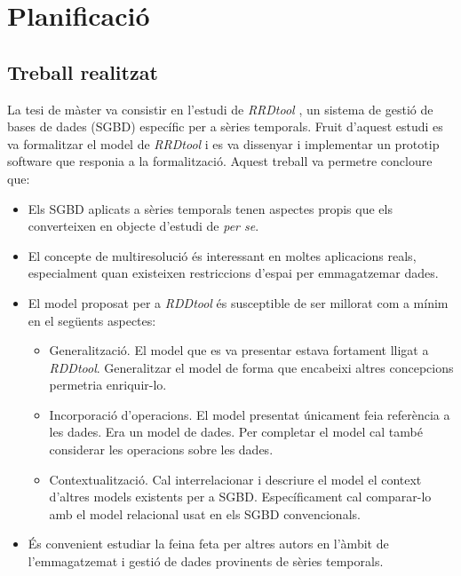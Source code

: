 \chapter{Planificació}

\section{Treball realitzat}


La tesi de màster \parencite{llusa11:tfm} va consistir en l'estudi de
\emph{RRDtool} \parencite{rrdtool}, un sistema de gestió de bases de
dades (SGBD) específic per a sèries temporals.
%
Fruit d'aquest estudi es va formalitzar el model de \emph{RRDtool} i es va
dissenyar i implementar un prototip software que responia a la
formalització.
%
Aquest treball va permetre concloure que:
\begin{itemize}
\item Els SGBD aplicats a sèries temporals tenen aspectes propis que
  els converteixen en objecte d'estudi de \emph{per se}.
\item El concepte de multiresolució és interessant en moltes
  aplicacions reals, especialment quan existeixen restriccions d'espai
  per emmagatzemar dades.
\item El model proposat per a \emph{RDDtool} és susceptible de ser millorat
  com a mínim en el següents aspectes:
  \begin{itemize}
  \item Generalització. El model que es va presentar estava fortament
    lligat a \emph{RDDtool}. Generalitzar el model de forma que encabeixi
    altres concepcions permetria enriquir-lo.
  \item Incorporació d'operacions. El model presentat únicament feia
    referència a les dades. Era un model de dades. Per completar el
    model cal també considerar les operacions sobre les dades.
  \item Contextualització. Cal interrelacionar i descriure el model el
    context d'altres models existents per a SGBD. Específicament cal
    comparar-lo amb el model relacional usat en els SGBD
    convencionals.
  \end{itemize}
\item És convenient estudiar la feina feta per altres autors en
  l'àmbit de l'emmagatzemat i gestió de dades provinents de sèries
  temporals.
\end{itemize}

